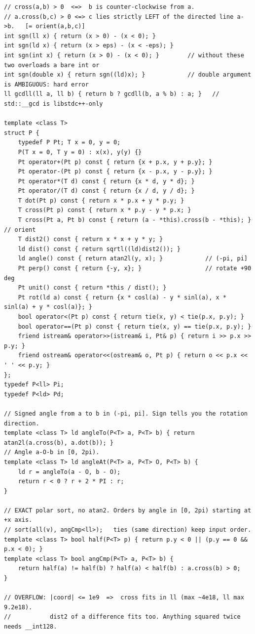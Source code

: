 \documentclass[9pt,a4paper,twocolumn]{extarticle}
\begin{document}
\begin{lstlisting}
// cross(a,b) > 0  <=>  b is counter-clockwise from a.
// a.cross(b,c) > 0 <=> c lies strictly LEFT of the directed line a->b.   [= orient(a,b,c)]
int sgn(ll x) { return (x > 0) - (x < 0); }
int sgn(ld x) { return (x > eps) - (x < -eps); }
int sgn(int x) { return (x > 0) - (x < 0); }        // without these two overloads a bare int or
int sgn(double x) { return sgn((ld)x); }            // double argument is AMBIGUOUS: hard error
ll gcdll(ll a, ll b) { return b ? gcdll(b, a % b) : a; }   // std::__gcd is libstdc++-only

template <class T>
struct P {
    typedef P Pt; T x = 0, y = 0;
    P(T x = 0, T y = 0) : x(x), y(y) {}
    Pt operator+(Pt p) const { return {x + p.x, y + p.y}; }
    Pt operator-(Pt p) const { return {x - p.x, y - p.y}; }
    Pt operator*(T d) const { return {x * d, y * d}; }
    Pt operator/(T d) const { return {x / d, y / d}; }
    T dot(Pt p) const { return x * p.x + y * p.y; }
    T cross(Pt p) const { return x * p.y - y * p.x; }
    T cross(Pt a, Pt b) const { return (a - *this).cross(b - *this); }  // orient
    T dist2() const { return x * x + y * y; }
    ld dist() const { return sqrtl((ld)dist2()); }
    ld angle() const { return atan2l(y, x); }            // (-pi, pi]
    Pt perp() const { return {-y, x}; }                  // rotate +90 deg
    Pt unit() const { return *this / dist(); }
    Pt rot(ld a) const { return {x * cosl(a) - y * sinl(a), x * sinl(a) + y * cosl(a)}; }
    bool operator<(Pt p) const { return tie(x, y) < tie(p.x, p.y); }
    bool operator==(Pt p) const { return tie(x, y) == tie(p.x, p.y); }
    friend istream& operator>>(istream& i, Pt& p) { return i >> p.x >> p.y; }
    friend ostream& operator<<(ostream& o, Pt p) { return o << p.x << ' ' << p.y; }
};
typedef P<ll> Pi;
typedef P<ld> Pd;

// Signed angle from a to b in (-pi, pi]. Sign tells you the rotation direction.
template <class T> ld angleTo(P<T> a, P<T> b) { return atan2l(a.cross(b), a.dot(b)); }
// Angle a-O-b in [0, 2pi).
template <class T> ld angleAt(P<T> a, P<T> O, P<T> b) {
    ld r = angleTo(a - O, b - O);
    return r < 0 ? r + 2 * PI : r;
}

// EXACT polar sort, no atan2. Orders by angle in [0, 2pi) starting at +x axis.
// sort(all(v), angCmp<ll>);   ties (same direction) keep input order.
template <class T> bool half(P<T> p) { return p.y < 0 || (p.y == 0 && p.x < 0); }
template <class T> bool angCmp(P<T> a, P<T> b) {
    return half(a) != half(b) ? half(a) < half(b) : a.cross(b) > 0;
}

// OVERFLOW: |coord| <= 1e9  =>  cross fits in ll (max ~4e18, ll max 9.2e18).
//           dist2 of a difference fits too. Anything squared twice needs __int128.
\end{lstlisting}
\end{document}
